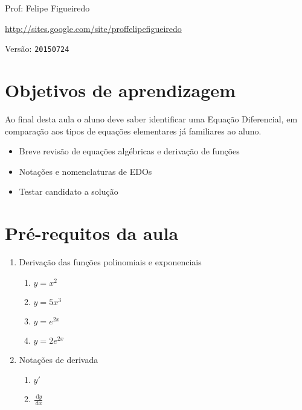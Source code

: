 \documentclass[a4paper]{article}
\newcommand{\ud}{\mathrm{\ d}}
\begin{document}
\parbox[c]{.825\textwidth}{\raggedright%
{Prof: Felipe Figueiredo\par}
{\url{http://sites.google.com/site/proffelipefigueiredo}\par}
}

Versão: \verb|20150724|



\section{Objetivos de aprendizagem}

Ao final desta aula o aluno deve saber identificar uma Equação
Diferencial, em comparação aos tipos de equações elementares já
familiares ao aluno.

\begin{itemize}
\item Breve revisão de equações algébricas e derivação de funções
\item Notações e nomenclaturas de EDOs
\item Testar candidato a solução
\end{itemize}


\section{Pré-requitos da aula}

\begin{enumerate}
\item Derivação das funções polinomiais e exponenciais
  \begin{enumerate}
  \item $y=x^2$
  \item $y=5x^3$
  \item $y=e^{2x}$
  \item $y=2e^{2x}$
  \end{enumerate}
\item Notações de derivada
  \begin{enumerate}
  \item $y'$
  \item $\frac{\ud y}{\ud x}$
  \end{enumerate}
\end{enumerate}
\end{document}
